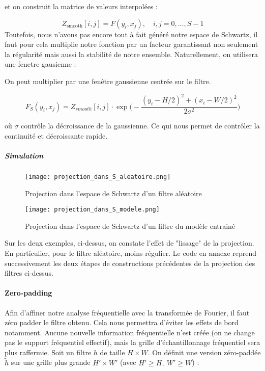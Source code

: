 \documentclass[12pt,a4paper]{article}
\begin{document}
et on construit la matrice de valeurs interpolées :

\[
Z_{\text{smooth}}[i,j] = F(y_i, x_j), \quad i,j = 0,\dots,S-1
\]
Toutefois, nous n'avons pas encore tout à fait généré notre espace de Schwartz, il faut pour cela multiplie notre fonction par un facteur garantissant non seulement la régularité mais aussi la stabilité de notre ensemble. Naturellement, on utilisera une fenetre gausienne : 

On peut multiplier par une fenêtre gaussienne centrée sur le filtre. 

\[
F_S(y_i,x_j) = Z_{smooth}[i,j] \cdot \exp\Bigg( - \frac{(y_i - H/2)^2 + (x_i - W/2)^2}{2\sigma^2} \Bigg)
\]

où $\sigma$ contrôle la décroissance de la gaussienne. Ce qui nous permet de contrôler la continuité et décroissante rapide. 
\subparagraph{Simulation} 


\begin{figure}[H] %
    \centering    %
    \texttt{[image: projection\_dans\_S\_aleatoire.png]} %
    \caption{Projection dans l'espace de Schwartz d'un filtre aléatoire} %
    \label{fig:mon_image} %
\end{figure}
\begin{figure}[H] %
    \centering    %
    \texttt{[image: projection\_dans\_S\_modele.png]} %
    \caption{Projection dans l'espace de Schwartz d'un filtre du modèle entrainé} %
    \label{fig:mon_image} %
\end{figure}
Sur les deux exemples, ci-dessus, on constate l'effet de "lissage" de la projection. En particulier, pour le filtre aléatoire, moins régulier.
Le code en annexe reprend successivement les deux étapes de constructions précédentes de la projection des filtres ci-dessus. 
\paragraph{Zero-padding}
Afin d'affiner notre analyse fréquentielle avec la transformée de Fourier, il faut zéro padder le filtre obtenu. Cela nous permettra d'éviter les effets de bord notamment. Aucune nouvelle information fréquentielle n’est créée (on ne change pas le support fréquentiel effectif), mais la grille d’échantillonnage fréquentiel sera plus raffermie. Soit un filtre $h$ de taille $H\times W$.  
On définit une version zéro-paddée $\tilde{h}$ sur une grille plus grande $H' \times W'$ (avec $H' \geq H,\ W' \geq W$) :
\end{document}
